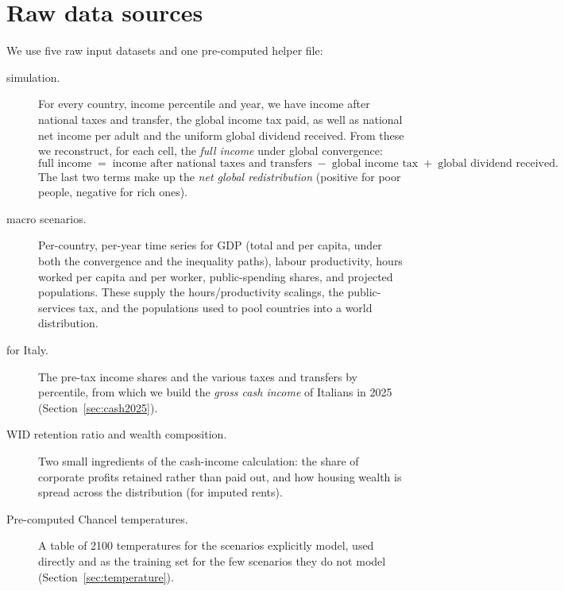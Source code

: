 \documentclass[12pt,a4paper]{article}
\newcommand{\note}[1]{%
  \begin{center}
    \colorbox{yellow!30}{\parbox{0.9\linewidth}{\textbf{Note:} #1}}
  \end{center}}
\newcommand{\scenario}[1]{\texttt{#1}}
\begin{document}

\section{Raw data sources}
\label{sec:data}

We use 
five raw input datasets and one pre-computed helper file:

\begin{description}
  \item[\citet{Bothe2026} simulation.] For every country, income percentile and year, we have income after national taxes and transfer, the global income tax paid, as well as national net income per adult and the uniform global dividend received. From these we reconstruct, for each cell, the \emph{full income} under global convergence:
    \[
      \text{full income} \;=\; \text{income after national taxes and transfers}
      \;-\; \text{global income tax} \;+\; \text{global dividend received}.
    \]
    The last two terms make up the \emph{net global redistribution} (positive for  poor people, negative for rich ones). %
  \item[\citet{Chancel2026} macro scenarios.] Per-country, per-year time series for GDP (total and  per capita, under both the convergence and the inequality paths), labour productivity, hours  worked per capita and per worker, public-spending shares, and projected populations. These supply the hours/productivity scalings, the public-services tax, and the populations used to  pool countries into a world distribution.
  \item[\citet{FisherGethin2023} for Italy.] The pre-tax income shares and the various taxes and transfers by percentile, from which we build the \emph{gross cash income} of Italians in 2025 (Section~\ref{sec:cash2025}). 
  \item[WID retention ratio and \citet{Garbinti2021} wealth composition.] Two small ingredients of  the cash-income calculation: the share of corporate profits retained rather than paid out, and  how housing wealth is spread across the distribution (for imputed rents).
  \item[Pre-computed Chancel temperatures.] A table of 2100 temperatures for the scenarios \citet{Chancel2026} explicitly model, used directly and as the training set for the few scenarios they do not model (Section~\ref{sec:temperature}).
\end{description}
\end{document}
